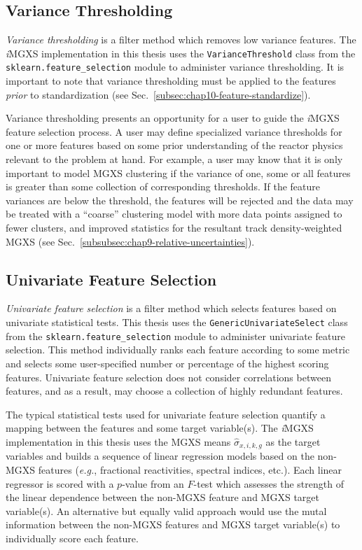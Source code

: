 \subsection{Variance Thresholding}
\label{subsec:chap10-var-threshold}

\textit{Variance thresholding} is a filter method which removes low variance features. The \textit{i}\ac{MGXS} implementation in this thesis uses the \texttt{VarianceThreshold} class from the \texttt{sklearn.feature_selection} module to administer variance thresholding. It is important to note that variance thresholding must be applied to the features \textit{prior} to standardization (see Sec.~\ref{subsec:chap10-feature-standardize}).

Variance thresholding presents an opportunity for a user to guide the \textit{i}\ac{MGXS} feature selection process. A user may define specialized variance thresholds for one or more features based on some prior understanding of the reactor physics relevant to the problem at hand. For example, a user may know that it is only important to model \ac{MGXS} clustering if the variance of one, some or all features is greater than some collection of corresponding thresholds. If the feature variances are below the threshold, the features will be rejected and the data may be treated with a ``coarse'' clustering model with more data points assigned to fewer clusters, and improved statistics for the resultant track density-weighted \ac{MGXS} (see Sec.~\ref{subsubsec:chap9-relative-uncertainties}).

\subsection{Univariate Feature Selection}
\label{subsec:chap10-univariate-selection}

\textit{Univariate feature selection} is a filter method which selects features based on univariate statistical tests. This thesis uses the \texttt{GenericUnivariateSelect} class from the \texttt{sklearn.feature_selection} module to administer univariate feature selection. This method individually ranks each feature according to some metric and selects some user-specified number or percentage of the highest scoring features. Univariate feature selection does not consider correlations between features, and as a result, may choose a collection of highly redundant features.

The typical statistical tests used for univariate feature selection quantify a mapping between the features and some target variable(s). The \textit{i}\ac{MGXS} implementation in this thesis uses the \ac{MGXS} means $\hat{\sigma}_{x,i,k,g}$ as the target variables and builds a sequence of linear regression models based on the non-\ac{MGXS} features (\textit{e.g.}, fractional reactivities, spectral indices, etc.). Each linear regressor is scored with a $p$-value from an $F$-test which assesses the strength of the linear dependence between the non-\ac{MGXS} feature and \ac{MGXS} target variable(s). An alternative but equally valid approach would use the mutal information between the non-\ac{MGXS} features and \ac{MGXS} target variable(s) to individually score each feature. 

